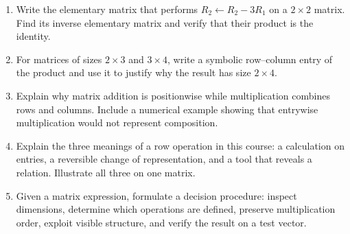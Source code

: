 \begin{enumerate}
\item Write the elementary matrix that performs $R_2\leftarrow R_2-3R_1$ on a $2\times2$ matrix. Find its inverse elementary matrix and verify that their product is the identity.

\item For matrices of sizes $2\times3$ and $3\times4$, write a symbolic row--column entry of the product and use it to justify why the result has size $2\times4$.

\item Explain why matrix addition is positionwise while multiplication combines rows and columns. Include a numerical example showing that entrywise multiplication would not represent composition.

\item Explain the three meanings of a row operation in this course: a calculation on entries, a reversible change of representation, and a tool that reveals a relation. Illustrate all three on one matrix.

\item Given a matrix expression, formulate a decision procedure: inspect dimensions, determine which operations are defined, preserve multiplication order, exploit visible structure, and verify the result on a test vector.
\end{enumerate}
